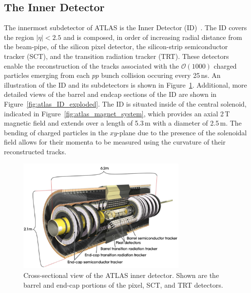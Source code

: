 \subsection{The Inner Detector}
\label{sec:inner_detector}

The innermost subdetector of ATLAS is the Inner Detector (ID)~\cite{Haywood:331064}.
The ID covers the region $\lvert \eta \rvert < 2.5$ and is composed, in order
of increasing radial distance from the beam-pipe, of the silicon pixel detector,
the silicon-strip semiconductor tracker (SCT), and the transition radiation tracker (TRT).
These detectors enable the reconstruction of the tracks associated with
the $\mathcal{O}(1000)$ charged particles emerging from each $pp$ bunch collision occuring
every 25\,ns.
An illustration of the ID and its subdetectors is shown in Figure~\ref{fig:atlas_inner_detector}.
Additional, more detailed views of the barrel and endcap sections of the ID are shown in Figure~\ref{fig:atlas_ID_exploded}.
The ID is situated inside of the central solenoid, indicated in Figure~\ref{fig:atlas_magnet_system},
which provides an axial 2\,T magnetic field and extends over a length of 5.3\,m with a diameter of 2.5\,m.
The bending of charged particles in the $xy$-plane due to the presence of the solenoidal
field allows for their momenta to be measured using the curvature of their reconstructed tracks.

\begin{figure}[!htb]
    \begin{center}
        \includegraphics[width=0.75\textwidth]{figures/chapter2/inner_detector/atlas_inner_detector}
        \caption{
            Cross-sectional view of the ATLAS inner detector. Shown are the barrel
            and end-cap portions of the pixel, SCT, and TRT detectors.
        }
        \label{fig:atlas_inner_detector}
    \end{center}
\end{figure}

